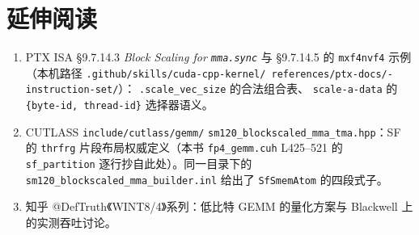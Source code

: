 \section*{延伸阅读}

\begin{enumerate}[itemsep=2pt,topsep=3pt]
  \item PTX ISA \S9.7.14.3 \emph{Block Scaling for \texttt{mma.sync}} 与
        \S9.7.14.5 的 \texttt{mxf4nvf4} 示例（本机路径
        \texttt{.github/\allowbreak skills/\allowbreak cuda-cpp-kernel/\allowbreak
        references/\allowbreak ptx-docs/-instruction-set/}）：
        \texttt{.scale\_vec\_size} 的合法组合表、
        \texttt{scale-a-data} 的 \texttt{\{byte-id, thread-id\}} 选择器语义。
  \item CUTLASS \texttt{include/\allowbreak cutlass/\allowbreak gemm/\allowbreak}
        \texttt{sm120\_blockscaled\_mma\_tma.hpp}：SF 的
        \texttt{thrfrg} 片段布局权威定义（本书
        \texttt{fp4\_gemm.cuh} L425--521 的 \texttt{sf\_partition}
        逐行抄自此处）。同一目录下的
        \texttt{sm120\_\allowbreak blockscaled\_\allowbreak mma\_builder.inl}
        给出了 \texttt{SfSmemAtom} 的四段式子。
  \item 知乎 @DefTruth《WINT8/4》系列：低比特 GEMM 的量化方案与
        Blackwell 上的实测吞吐讨论。
\end{enumerate}
